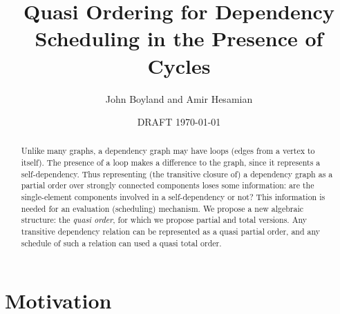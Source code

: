 \documentclass[12pt]{article}
\theoremstyle{definition}
\theoremstyle{theorem}
\begin{document}
\title{Quasi Ordering for Dependency Scheduling in the Presence of Cycles}
\author{John Boyland and Amir Hesamian}
\date{DRAFT \today}

\maketitle

\begin{abstract}
  Unlike many graphs, a dependency graph may have loops (edges from a
  vertex to itself).  The presence of a loop makes a difference to the
  graph, since it represents a self-dependency.  Thus representing
  (the transitive closure of) a dependency graph as a partial order
  over strongly connected components loses some information: are the
  single-element components involved in a self-dependency or not?
  This information is needed for an evaluation (scheduling)
  mechanism.  We propose a new algebraic structure: the \emph{quasi
  order}, for which we propose partial and total versions.  Any
  transitive dependency relation can be represented as a quasi partial
  order, and any schedule of such a relation can used a quasi total order. 
\end{abstract}

\section{Motivation}
\end{document}
